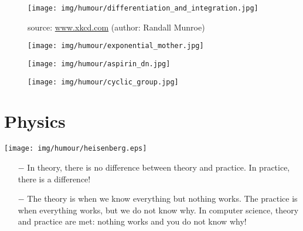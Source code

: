 	\begin{figure}[H]
		\centering
		\texttt{[image: img/humour/differentiation\_and\_integration.jpg]}
		\caption[]{source: \url{www.xkcd.com} (author: Randall Munroe)}
	\end{figure}
	
	\begin{figure}[H]
		\centering
		\texttt{[image: img/humour/exponential\_mother.jpg]}
	\end{figure}
	
	\begin{center}\underline{\hspace{5 cm}}\end{center}	
	
	\begin{figure}[H]
		\centering
		\texttt{[image: img/humour/aspirin\_dn.jpg]}
	\end{figure}
	
	\begin{figure}[H]
		\centering
		\texttt{[image: img/humour/cyclic\_group.jpg]}
	\end{figure}
	

	\pagebreak
	\section{Physics}
	
	\begin{center}
	\texttt{[image: img/humour/heisenberg.eps]}
	\end{center}
	
	\begin{center}\underline{\hspace{5 cm}}\end{center}	
	
	\begin{itemize}	 
		\item[$-$] In theory, there is no difference between theory and practice. In practice, there is a difference!
	
		\item[$-$] The theory is when we know everything but nothing works. The practice is when everything works, but we do not know why. In computer science, theory and practice are met: nothing works and you do not know why!
	\end{itemize}

	\begin{center}\underline{\hspace{5 cm}}\end{center}

